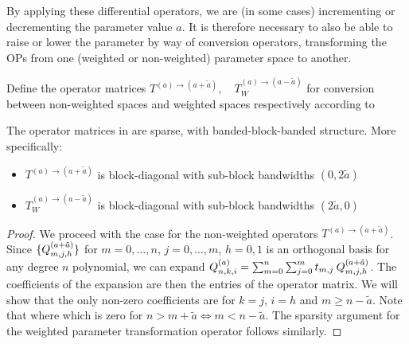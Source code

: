 By applying these differential operators, we are (in some cases) incrementing or decrementing the parameter value $a$. It is therefore necessary to also be able to raise or lower the parameter by way of conversion operators, transforming the OPs from one (weighted or non-weighted) parameter space to another.
\begin{definition}\label{def:sc:parametertransformationoperators}
Define the operator matrices $T^{(a)\to(a+\tilde a)}, \quad T_W^{(a)\to(a-\tilde a)}$ for conversion between non-weighted spaces and weighted spaces respectively according to
\end{definition}

\begin{lemma}\label{lemma:sc:sparsityofparametertransformationoperators}
The operator matrices in  are sparse, with banded-block-banded structure. More specifically:
\begin{itemize}
	\item $T^{(a)\to(a+\tilde a)}$ is block-diagonal with sub-block bandwidths $(0,2\tilde a)$
	\item $T_W^{(a)\to(a-\tilde a)}$ is block-diagonal with sub-block bandwidths $(2\tilde a, 0)$
\end{itemize}
\end{lemma}

\begin{proof}
We proceed with the case for the non-weighted operators $T^{(a)\to(a+\tilde a)}$. Since $\{Q_{m,j,h}^{(a+\tilde{a})}\}$ for $m = 0,\dots,n$, $j = 0,\dots,m$, $h = 0,1$ is an orthogonal basis for any degree $n$ polynomial, we can expand $Q_{n,k,i}^{(a)} = \sum_{m=0}^{n} \sum_{j=0}^m t_{m,j} \: Q_{m,j,h}^{(a+\tilde{a})}$. The coefficients of the expansion are then the entries of the operator matrix. We will show that the only non-zero coefficients are for $k = j$, $i = h$ and $m \ge  n - \tilde a$. Note that
where
which is zero for $n > m + \tilde a \iff m < n - \tilde a$. The sparsity argument for the weighted parameter transformation operator follows similarly.
\end{proof}

